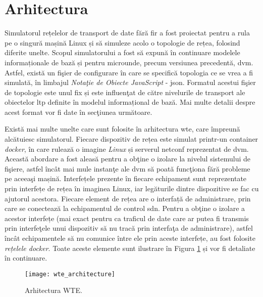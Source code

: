 \section{Arhitectura}

Simulatorul rețelelor de transport de date fără fir a fost proiectat pentru a rula pe o singură mașină Linux și să simuleze acolo o topologie de rețea, folosind diferite unelte. Scopul simulatorului a fost să expună în continuare modelele informaționale de bază și pentru microunde, precum versiunea precedentă, \gls{dvm}. Astfel, există un fişier de configurare în care se specifică topologia ce se vrea a fi simulată, în limbajul \textit{Notaţie de Obiecte JavaScript} - \gls{json}. Formatul acestui fişier de topologie este unul fix și este influenţat de către nivelurile de transport ale obiectelor \gls{ltp} definite în modelul informațional de bază. Mai multe detalii despre acest format vor fi date în secţiunea următoare.

Există mai multe unelte care sunt folosite în arhitectura \gls{wte}, care împreună alcătuiesc simulatorul. Fiecare dispozitiv de rețea este simulat printr-un container \textit{docker}, în care rulează o imagine \textit{Linux} și serverul \gls{netconf} reprezentat de \gls{dvm}. Această abordare a fost aleasă pentru a obţine o izolare la nivelul sistemului de fişiere, astfel încât mai mule instanţe ale \gls{dvm} să poată funcţiona fără probleme pe aceeaşi mașină. Interfețele prezente în fiecare echipament sunt reprezentate prin interfețe de rețea în imaginea Linux, iar legăturile dintre dispozitive se fac cu ajutorul acestora. Fiecare element de rețea are o interfață de administrare, prin care se conectează la echipamentul de control \gls{sdn}. Pentru a obţine o izolare a acestor interfețe (mai exact pentru ca traficul de date care ar putea fi transmis prin interfeţele unui dispozitiv să nu tracă prin interfaţa de administrare), astfel încât echipamentele să nu comunice între ele prin aceste interfețe, au fost folosite \textit{rețelele docker}. Toate aceste elemente sunt ilustrare în Figura \ref{fig:wte_architecture} și vor fi detaliate în continuare.

\begin{figure}[h]
	\centering
	\texttt{[image: wte\_architecture]}
	\caption{Arhitectura WTE.}
	\label{fig:wte_architecture}
\end{figure}


